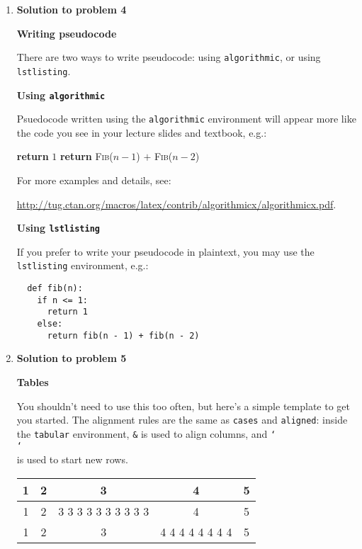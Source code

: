 \documentclass[11pt]{article}
\newcommand{\problemitem}[1]{
  \bigskip
  \item {\bf Solution to problem #1}
  \medskip
}
\newcommand{\BACKSLASH}{\char`\\ }
\begin{document}
\begin{enumerate}
\newpage

\problemitem{4}

{\large \textbf{Writing pseudocode}}

There are two ways to write pseudocode: using \texttt{algorithmic}, or using
\texttt{lstlisting}.

\medskip
\textbf{Using \texttt{algorithmic}}

Psuedocode written using the \texttt{algorithmic} environment will appear more
like the code you see in your lecture slides and textbook, e.g.:

\begin{algorithmic}
      \State \textbf{return} $1$
    \Else
      \State \textbf{return} \textsc{Fib}($n - 1$) $+$ \textsc{Fib}($n - 2$)
    \EndIf
  \EndFunction
\end{algorithmic}

For more examples and details, see:

\url{http://tug.ctan.org/macros/latex/contrib/algorithmicx/algorithmicx.pdf}.

\medskip
\textbf{Using \texttt{lstlisting}}

If you prefer to write your pseudocode in plaintext, you may use the
\texttt{lstlisting} environment, e.g.:

\begin{lstlisting}
  def fib(n):
    if n <= 1:
      return 1
    else:
      return fib(n - 1) + fib(n - 2)
\end{lstlisting}


\problemitem{5}

{\large \textbf{Tables}}

You shouldn't need to use this too often, but here's a simple template to get
you started. The alignment rules are the same as \texttt{cases} and
\texttt{aligned}: inside the \texttt{tabular} environment, \texttt{\&} is used
to align columns, and \texttt{\BACKSLASH \BACKSLASH} is used to start new rows.

\begin{table}[tbh]
  \centering
  \renewcommand\arraystretch{1.5}
  \begin{tabular}{|c|c|c|c|c|}\hline
    1 & 2 & 3 & 4 & 5\\ \hline %
  1   & 2 &  3 3 3 3 3 3 3 3 3 3     &4&5 \\ \hline %
  1
      & 2 &3
& 4 4 4 4 4 4 4 4 & 5
\\
\hline %

  \end{tabular}
\end{table}

\end{enumerate}
\end{document}

